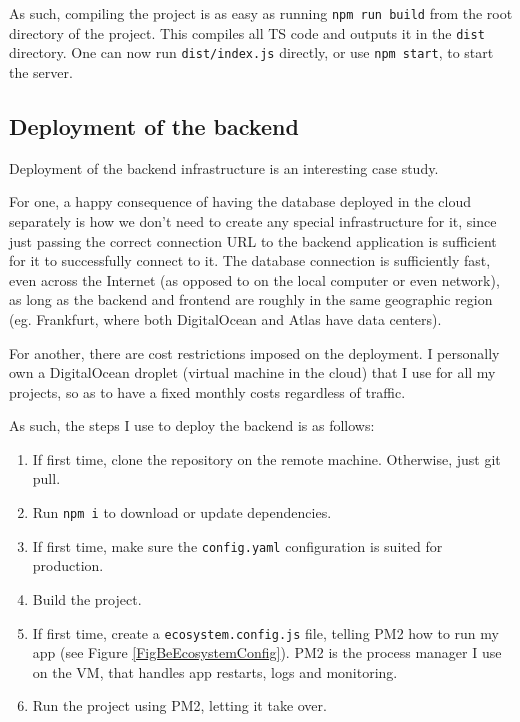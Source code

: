 As such, compiling the project is as easy as running \verb|npm run build| from the root directory of the project. This compiles all TS code and outputs it in the \verb|dist| directory. One can now run \verb|dist/index.js| directly, or use \verb|npm start|, to start the server.

\subsection{Deployment of the backend}
\label{sec:BeDeployment}
Deployment of the backend infrastructure is an interesting case study.

For one, a happy consequence of having the database deployed in the cloud separately is how we don't need to create any special infrastructure for it, since just passing the correct connection URL to the backend application is sufficient for it to successfully connect to it. The database connection is sufficiently fast, even across the Internet (as opposed to on the local computer or even network), as long as the backend and frontend are roughly in the same geographic region (eg. Frankfurt, where both DigitalOcean and Atlas have data centers).

For another, there are cost restrictions imposed on the deployment. I personally own a DigitalOcean droplet (virtual machine in the cloud) that I use for all my projects, so as to have a fixed monthly costs regardless of traffic.

As such, the steps I use to deploy the backend is as follows:
\begin{enumerate}
    \item If first time, clone the repository on the remote machine. Otherwise, just git pull.
    \item Run \verb|npm i| to download or update dependencies.
    \item If first time, make sure the \verb|config.yaml| configuration is suited for production.
    \item Build the project.
    \item If first time, create a \verb|ecosystem.config.js| file, telling PM2 how to run my app (see Figure \ref{FigBeEcosystemConfig}). PM2 is the process manager I use on the VM, that handles app restarts, logs and monitoring.
    \item Run the project using PM2, letting it take over.
\end{enumerate}

